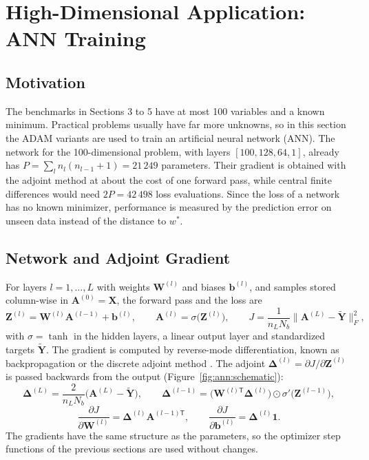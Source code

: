 \documentclass[11pt,a4paper]{article}
\begin{document}
\section{High-Dimensional Application: ANN Training}
\label{sec:ann}

\FloatBarrier
\subsection{Motivation}
\label{sec:ann:motivation}
The benchmarks in Sections 3 to 5 have at most 100 variables and a known minimum. Practical problems usually have far more unknowns, so in this section the ADAM variants are used to train an artificial neural network (ANN). The network for the 100-dimensional problem, with layers $[100, 128, 64, 1]$, already has $P = \sum_{l} n_l(n_{l-1}+1) = 21\,249$ parameters. Their gradient is obtained with the adjoint method at about the cost of one forward pass, while central finite differences would need $2P = 42\,498$ loss evaluations. Since the loss of a network has no known minimizer, performance is measured by the prediction error on unseen data instead of the distance to $w^*$.

\FloatBarrier
\subsection{Network and Adjoint Gradient}
\label{sec:ann:adjoint}
For layers $l=1,\dots,L$ with weights $\bm{W}^{(l)}$ and biases $\bm{b}^{(l)}$, and samples stored column-wise in $\bm{A}^{(0)}=\bm{X}$, the forward pass and the loss are
\begin{equation}
  \bm{Z}^{(l)} = \bm{W}^{(l)}\bm{A}^{(l-1)} + \bm{b}^{(l)}, \qquad
  \bm{A}^{(l)} = \sigma\big(\bm{Z}^{(l)}\big), \qquad
  J = \frac{1}{n_L N_b}\big\| \bm{A}^{(L)} - \tilde{\bm{Y}} \big\|_F^2 ,
\end{equation}
with $\sigma=\tanh$ in the hidden layers, a linear output layer and standardized targets $\tilde{\bm{Y}}$. The gradient is computed by reverse-mode differentiation, known as backpropagation \cite{rumelhart1986learning} or the discrete adjoint method \cite{baydin2018automatic}. The adjoint $\bm{\Delta}^{(l)} = \partial J/\partial \bm{Z}^{(l)}$ is passed backwards from the output (Figure~\ref{fig:ann:schematic}):
\begin{equation}
  \bm{\Delta}^{(L)} = \frac{2}{n_L N_b}\big(\bm{A}^{(L)} - \tilde{\bm{Y}}\big), \qquad
  \bm{\Delta}^{(l-1)} = \big(\bm{W}^{(l)\mathsf T}\bm{\Delta}^{(l)}\big)\odot\sigma'\big(\bm{Z}^{(l-1)}\big),
\end{equation}
\begin{equation}
  \frac{\partial J}{\partial \bm{W}^{(l)}} = \bm{\Delta}^{(l)}\bm{A}^{(l-1)\mathsf T},
  \qquad
  \frac{\partial J}{\partial \bm{b}^{(l)}} = \bm{\Delta}^{(l)}\mathbf{1}.
\end{equation}
The gradients have the same structure as the parameters, so the optimizer step functions of the previous sections are used without changes.
\end{document}
